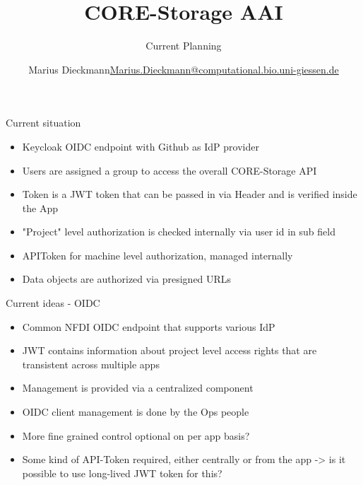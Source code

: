 \documentclass[aspectratio=169]{beamer}
\title{CORE-Storage AAI}
\subtitle{Current Planning}
\author{
	Marius Dieckmann\inst{1,2,3}\newline\url{Marius.Dieckmann@computational.bio.uni-giessen.de}
}
\institute[shortinst]{\textsuperscript{1} Justus-Liebig-Universität Gießen \and \inst{2} NFDI4Biodiversity \and \inst{3} de.NBI}
\begin{document}
    \begin{frame}[plain]
        \maketitle
    \end{frame}
    \begin{frame}{Current situation}
        \begin{itemize}
            \item Keycloak OIDC endpoint with Github as IdP provider
            \item Users are assigned a group to access the overall CORE-Storage API
            \item Token is a JWT token that can be passed in via Header and is verified inside the App
            \item "Project" level authorization is checked internally via user id in sub field
            \item APIToken for machine level authorization, managed internally
            \item Data objects are authorized via presigned URLs
        \end{itemize}
    \end{frame}
    \begin{frame}{Current ideas - OIDC}
        \begin{itemize}
            \item Common NFDI OIDC endpoint that supports various IdP
            \item JWT contains information about project level access rights that are transistent across multiple apps
            \item Management is provided via a centralized component
            \item OIDC client management is done by the Ops people
            \item More fine grained control optional on per app basis?
            \item Some kind of API-Token required, either centrally or from the app -> is it possible to use long-lived JWT token for this?
        \end{itemize}
    \end{frame}
\end{document}
